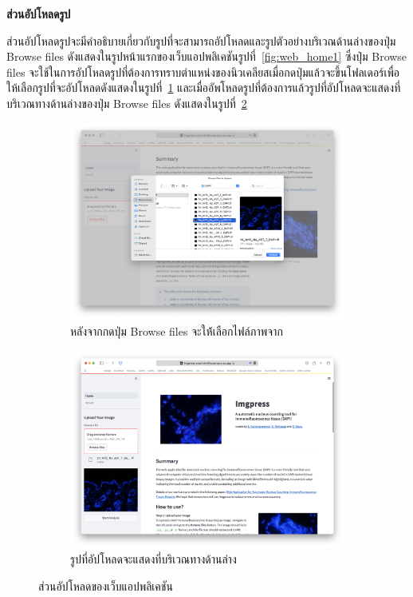\documentclass[12pt,oneside,openright,a4paper]{cpe-thai-project}
\begin{document}
\textbf{ส่วนอัปโหลดรูป}

ส่วนอัปโหลดรูปจะมีคำอธิบายเกี่ยวกับรูปที่จะสามารถอัปโหลดและรูปตัวอย่างบริเวณด้านล่างของปุ่ม Browse files ดังแสดงในรูปหน้าแรกของเว็บแอปพลิเคชันรูปที่~\ref{fig:web_home1} ซึ่งปุ่ม Browse files จะใช้ในการอัปโหลดรูปที่ต้องการทราบตำแหน่งของนิวเคลียสเมื่อกดปุ่มแล้วจะขึ้นโฟลเดอร์เพื่อให้เลือกรูปที่จะอัปโหลดดังแสดงในรูปที่~\ref{fig:web_upload1}  และเมื่ออัพโหลดรูปที่ต้องการแล้วรูปที่อัปโหลดจะแสดงที่บริเวณทางด้านล่างของปุ่ม Browse files ดังแสดงในรูปที่~\ref{fig:web_upload2} 
\begin{figure}[!h]
\centering
    \begin{subfigure}[b]{0.42\textwidth}
      \centering
        \includegraphics[width=\textwidth]{images/upload.png}
        \caption{หลังจากกดปุ่ม Browse files จะให้้เลือกไฟล์ภาพจาก}\label{fig:web_upload1}
    \end{subfigure}
    \begin{subfigure}[b]{0.42\textwidth}
        \centering
        \includegraphics[width=\textwidth]{images/upload_success.png}
        \caption{รูปที่อัปโหลดจะแสดงที่บริเวณทางด้านล่าง}\label{fig:web_upload2}
    \end{subfigure}
    \caption{ส่วนอัปโหลดของเว็บแอปพลิเคชัน}
    \label{fig:uploadweb}
\end{figure}
\end{document}
